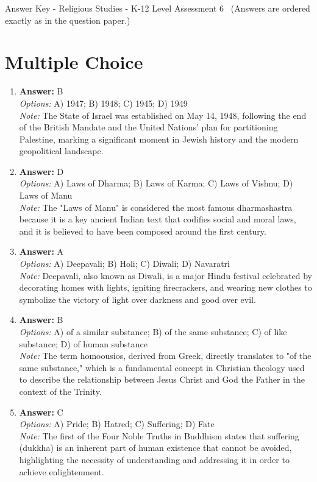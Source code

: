 \documentclass[12pt]{article}
\begin{document}
\begin{center}
Answer Key - Religious Studies - K-12 Level Assessment 6 \
\small (Answers are ordered exactly as in the question paper.)
\end{center}

\section*{Multiple Choice}
\begin{enumerate}[label=\arabic*.]
\item \textbf{Answer:} B
\\ \textit{Options:} A) 1947; B) 1948; C) 1945; D) 1949
\\ \textit{Note:} The State of Israel was established on May 14, 1948, following the end of the British Mandate and the United Nations' plan for partitioning Palestine, marking a significant moment in Jewish history and the modern geopolitical landscape.
\item \textbf{Answer:} D
\\ \textit{Options:} A) Laws of Dharma; B) Laws of Karma; C) Laws of Vishnu; D) Laws of Manu
\\ \textit{Note:} The "Laws of Manu" is considered the most famous dharmashastra because it is a key ancient Indian text that codifies social and moral laws, and it is believed to have been composed around the first century.
\item \textbf{Answer:} A
\\ \textit{Options:} A) Deepavali; B) Holi; C) Diwali; D) Navaratri
\\ \textit{Note:} Deepavali, also known as Diwali, is a major Hindu festival celebrated by decorating homes with lights, igniting firecrackers, and wearing new clothes to symbolize the victory of light over darkness and good over evil.
\item \textbf{Answer:} B
\\ \textit{Options:} A) of a similar substance; B) of the same substance; C) of like substance; D) of human substance
\\ \textit{Note:} The term homoousios, derived from Greek, directly translates to "of the same substance," which is a fundamental concept in Christian theology used to describe the relationship between Jesus Christ and God the Father in the context of the Trinity.
\item \textbf{Answer:} C
\\ \textit{Options:} A) Pride; B) Hatred; C) Suffering; D) Fate
\\ \textit{Note:} The first of the Four Noble Truths in Buddhism states that suffering (dukkha) is an inherent part of human existence that cannot be avoided, highlighting the necessity of understanding and addressing it in order to achieve enlightenment.
\end{enumerate}
\end{document}
